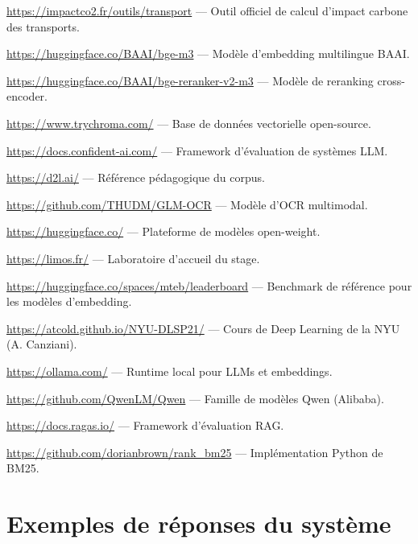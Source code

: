 \documentclass[11pt,a4paper]{article}
\begin{document}
\begin{description}[leftmargin=1cm,labelwidth=3cm]
  \item[ADEME Impact CO\textsubscript{2}] \url{https://impactco2.fr/outils/transport} --- Outil officiel de calcul d'impact carbone des transports.
  \item[BGE-M3 (HuggingFace)] \url{https://huggingface.co/BAAI/bge-m3} --- Modèle d'embedding multilingue BAAI.
  \item[BGE-Reranker-v2-m3] \url{https://huggingface.co/BAAI/bge-reranker-v2-m3} --- Modèle de reranking cross-encoder.
  \item[ChromaDB] \url{https://www.trychroma.com/} --- Base de données vectorielle open-source.
  \item[DeepEval] \url{https://docs.confident-ai.com/} --- Framework d'évaluation de systèmes LLM.
  \item[Dive into Deep Learning] \url{https://d2l.ai/} --- Référence pédagogique du corpus.
  \item[GLM-OCR] \url{https://github.com/THUDM/GLM-OCR} --- Modèle d'OCR multimodal.
  \item[HuggingFace] \url{https://huggingface.co/} --- Plateforme de modèles open-weight.
  \item[LIMOS] \url{https://limos.fr/} --- Laboratoire d'accueil du stage.
  \item[MTEB Leaderboard] \url{https://huggingface.co/spaces/mteb/leaderboard} --- Benchmark de référence pour les modèles d'embedding.
  \item[NYU-DLSP21] \url{https://atcold.github.io/NYU-DLSP21/} --- Cours de Deep Learning de la NYU (A. Canziani).
  \item[Ollama] \url{https://ollama.com/} --- Runtime local pour LLMs et embeddings.
  \item[Qwen (GitHub)] \url{https://github.com/QwenLM/Qwen} --- Famille de modèles Qwen (Alibaba).
  \item[Ragas] \url{https://docs.ragas.io/} --- Framework d'évaluation RAG.
  \item[Rank-BM25] \url{https://github.com/dorianbrown/rank_bm25} --- Implémentation Python de BM25.
\end{description}

\appendix
\section{Exemples de réponses du système}
\label{app:exemples}
\end{document}
